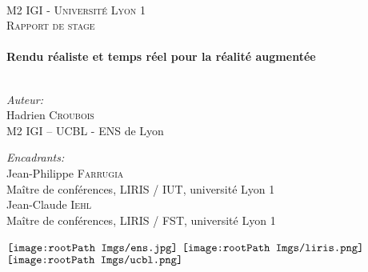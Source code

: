 \documentclass[10pt,a4paper,twoside, twocolumn]{report}
\newcommand*{\rootPath}{../}
\begin{document}
\begin{titlepage}
\begin{center}
		
	~\\[3.0cm]
	
	\textsc{\LARGE M2 IGI - Université Lyon 1}\\[1.5cm]
	\textsc{\Large Rapport de stage}\\[1.5cm]
	
	\HRule \\[0.4cm]
	{ \huge \bfseries Rendu réaliste et temps réel pour la réalité augmentée \\[0.4cm] }
	\HRule \\[1.5cm]

	\begin{minipage}[t]{0.4\textwidth}
	\begin{flushleft}
			\large \emph{Auteur:}\\[0.2cm]
			\large Hadrien \textsc{Croubois}\\
			\small M2 IGI -- UCBL - ENS de Lyon
	\end{flushleft}
	\end{minipage}
	\begin{minipage}[t]{0.5\textwidth}
	\begin{flushright}
			\large \emph{Encadrants:} \\[0.2cm]
			\large Jean-Philippe \textsc{Farrugia}\\
			\small Maître de conférences, LIRIS / IUT, université Lyon 1\\[0.2cm]
			\large Jean-Claude \textsc{Iehl}\\
			\small Maître de conférences, LIRIS / FST, université Lyon 1\\[0.2cm]
			\small
	\end{flushright}
	\end{minipage}

	\vfill

	\begin{minipage}{\textwidth}
	\begin{center}
		$\vcenter{\hbox{\texttt{[image: \\rootPath Imgs/ens.jpg]}}}$
		\hspace*{2cm}
		$\vcenter{\hbox{\texttt{[image: \\rootPath Imgs/liris.png]}}}$
		\hspace*{2cm}
		$\vcenter{\hbox{\texttt{[image: \\rootPath Imgs/ucbl.png]}}}$
	\end{center}
	\end{minipage}
\end{center}
\end{titlepage}
\end{document}
